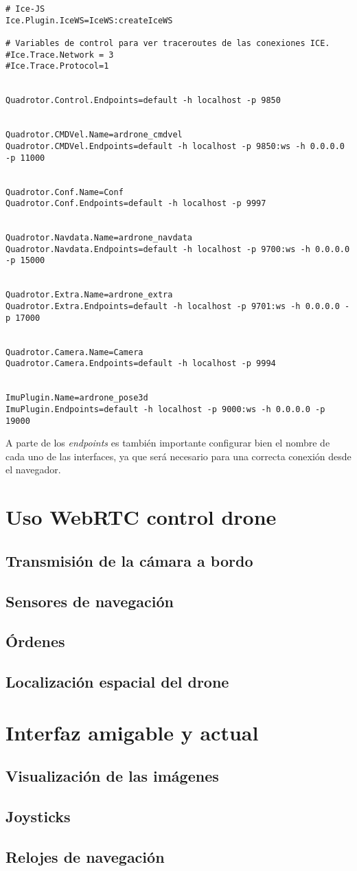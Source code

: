 \begin{lstlisting}[caption=Archivo de configuración]
# Ice-JS
Ice.Plugin.IceWS=IceWS:createIceWS

# Variables de control para ver traceroutes de las conexiones ICE.
#Ice.Trace.Network = 3
#Ice.Trace.Protocol=1


Quadrotor.Control.Endpoints=default -h localhost -p 9850


Quadrotor.CMDVel.Name=ardrone_cmdvel
Quadrotor.CMDVel.Endpoints=default -h localhost -p 9850:ws -h 0.0.0.0 -p 11000


Quadrotor.Conf.Name=Conf
Quadrotor.Conf.Endpoints=default -h localhost -p 9997


Quadrotor.Navdata.Name=ardrone_navdata
Quadrotor.Navdata.Endpoints=default -h localhost -p 9700:ws -h 0.0.0.0 -p 15000


Quadrotor.Extra.Name=ardrone_extra
Quadrotor.Extra.Endpoints=default -h localhost -p 9701:ws -h 0.0.0.0 -p 17000


Quadrotor.Camera.Name=Camera
Quadrotor.Camera.Endpoints=default -h localhost -p 9994


ImuPlugin.Name=ardrone_pose3d
ImuPlugin.Endpoints=default -h localhost -p 9000:ws -h 0.0.0.0 -p 19000
\end{lstlisting}

A parte de los \emph{endpoints} es también importante configurar bien el nombre de cada uno de las interfaces, ya que será necesario para una correcta conexión desde el navegador.\\

\section{Uso WebRTC control drone}
\subsection{Transmisión de la cámara a bordo}
\subsection{Sensores de navegación}
\subsection{Órdenes}
\subsection{Localización espacial del drone}


\section{Interfaz amigable y actual}
\subsection{Visualización de las imágenes}
\subsection{Joysticks}
\subsection{Relojes de navegación}